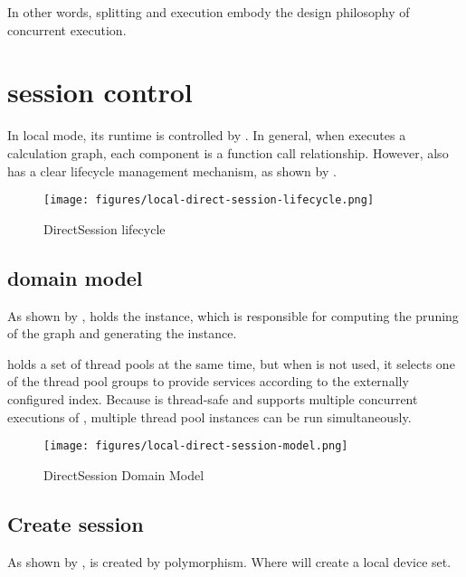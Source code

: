 \begin{content}
In other words, splitting and execution embody the design philosophy of \tf{} concurrent execution.

\section{session control}

In local mode, its runtime is controlled by . In general, when  executes a calculation graph, each component is a function call relationship. However,  also has a clear lifecycle management mechanism, as shown by .

\begin{figure}[H]
\centering
\texttt{[image: figures/local-direct-session-lifecycle.png]}
\caption{DirectSession lifecycle}
 \label{fig:local-direct-session-lifecycle}
\end{figure}

\subsection{domain model}

As shown by ,  holds the  instance, which is responsible for computing the pruning of the graph and generating the  instance.

 holds a set of thread pools at the same time, but when  is not used, it selects one of the thread pool groups to provide services according to the externally configured index. Because  is thread-safe and supports multiple concurrent executions of , multiple thread pool instances can be run simultaneously.

\begin{figure}[H]
\centering
\texttt{[image: figures/local-direct-session-model.png]}
\caption{DirectSession Domain Model}
 \label{fig:local-direct-session-model}
\end{figure}

\subsection{Create session}

As shown by ,  is created by  polymorphism. Where  will create a local device set.


\end{content}

